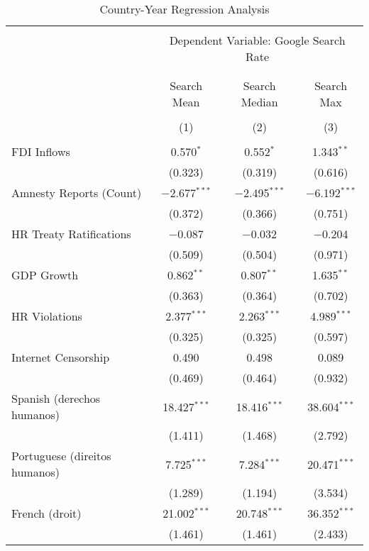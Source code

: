 
\begin{table}[!htbp] \centering 
  \caption{Country-Year Regression Analysis} 
  \label{} 
\begin{tabular}{@{\extracolsep{5pt}}lccc} 
\\[-1.8ex]\hline 
\hline \\[-1.8ex] 
 & \multicolumn{3}{c}{Dependent Variable: Google Search Rate} \\ 
\cline{2-4} 
\\[-1.8ex] & \multicolumn{3}{c}{ } \\ 
 & Search Mean & Search Median & Search Max \\ 
\\[-1.8ex] & (1) & (2) & (3)\\ 
\hline \\[-1.8ex] 
 FDI Inflows & 0.570$^{*}$ & 0.552$^{*}$ & 1.343$^{**}$ \\ 
  & (0.323) & (0.319) & (0.616) \\ 
  Amnesty Reports (Count) & $-$2.677$^{***}$ & $-$2.495$^{***}$ & $-$6.192$^{***}$ \\ 
  & (0.372) & (0.366) & (0.751) \\ 
  HR Treaty Ratifications & $-$0.087 & $-$0.032 & $-$0.204 \\ 
  & (0.509) & (0.504) & (0.971) \\ 
  GDP Growth & 0.862$^{**}$ & 0.807$^{**}$ & 1.635$^{**}$ \\ 
  & (0.363) & (0.364) & (0.702) \\ 
  HR Violations & 2.377$^{***}$ & 2.263$^{***}$ & 4.989$^{***}$ \\ 
  & (0.325) & (0.325) & (0.597) \\ 
  Internet Censorship & 0.490 & 0.498 & 0.089 \\ 
  & (0.469) & (0.464) & (0.932) \\ 
  Spanish (derechos humanos) & 18.427$^{***}$ & 18.416$^{***}$ & 38.604$^{***}$ \\ 
  & (1.411) & (1.468) & (2.792) \\ 
  Portuguese (direitos humanos) & 7.725$^{***}$ & 7.284$^{***}$ & 20.471$^{***}$ \\ 
  & (1.289) & (1.194) & (3.534) \\ 
  French (droit) & 21.002$^{***}$ & 20.748$^{***}$ & 36.352$^{***}$ \\ 
  & (1.461) & (1.461) & (2.433) \\ 

\end{tabular}
\end{table}
